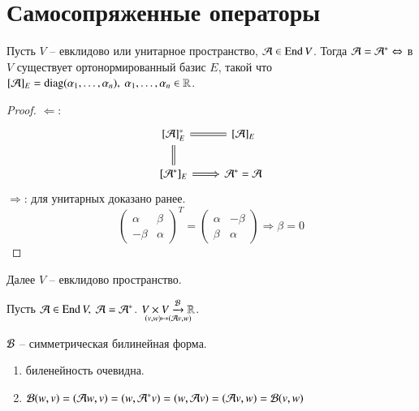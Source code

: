 \documentclass[main]{subfiles}
\begin{document}
\chapter{Самосопряженные операторы}

\begin{proposition}
    Пусть $V$ -- евклидово или унитарное пространство, $\mathcal{A} \in \operatorname{End} V$. Тогда $\mathcal{A} = \mathcal{A}^* \Leftrightarrow$ в $V$ существует ортонормированный базис $E$, такой что
    $[\mathcal{A}]_E = \operatorname{diag}(\alpha_1, \ldots, \alpha_n), \  \alpha_1, \ldots, \alpha_n \in \mathbb{R}$.
\end{proposition}

\begin{proof}
    $\Leftarrow$:
    \[\begin{tikzcd}
        {[\mathcal{A}]^*_E} & {[\mathcal{A}]_E} \\
        {[\mathcal{A}^*]_E} & {\mathcal{A}^* = \mathcal{A}}
        \arrow[Rightarrow, no head, from=1-1, to=2-1]
        \arrow[Rightarrow, no head, from=1-1, to=1-2]
        \arrow[Rightarrow, from=2-1, to=2-2]
    \end{tikzcd}\]
    $\Rightarrow$: для унитарных доказано ранее.
    \[\begin{pmatrix}
        \alpha & \beta \\
        -\beta & \alpha
    \end{pmatrix}^T = \begin{pmatrix}
        \alpha & -\beta \\
        \beta & \alpha
    \end{pmatrix} \Rightarrow \beta = 0 \]
\end{proof}


Далее $V$ -- евклидово пространство.

Пусть $\mathcal{A} \in \operatorname{End} V, \ \mathcal{A} = \mathcal{A}^*$. $\underset{(v, w) \mapsto (\mathcal{A} v, w)}{V\times V \xrightarrow{\mathcal{B}} \mathbb{R}}$.

\begin{proposition}
    $\mathcal{B}$ -- симметрическая билинейная форма. 

    \begin{enumerate}
        \item биленейность очевидна.
        \item $\mathcal{B}(w, v) = (\mathcal{A} w, v) = (w, \mathcal{A}^*v) = (w, \mathcal{A} v) = (\mathcal{A} v, w) = \mathcal{B}(v, w)$
    \end{enumerate}
\end{proposition}
\end{document}
